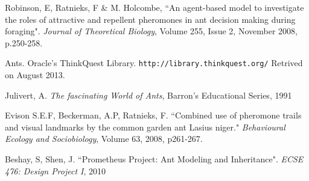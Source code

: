 \documentclass[titlepage, 12pt]{article}
\begin{document}
\begin{thebibliography}{9}

  Robinson, E, Ratnieks, F \& M. Holcombe, 
  ``An agent-based model to investigate the roles of attractive and repellent pheromones in ant decision making during foraging". \emph{Journal of Theoretical Biology}, Volume 255, Issue 2, November 2008, p.250-258.
  
Ants. Oracle's ThinkQuest Library. {\tt http://library.thinkquest.org/} Retrived on August 2013. 

Julivert, A. \emph{The fascinating World of Ants}, Barron's Educational Series, 1991

Evison S.E.F, Beckerman, A.P, Ratnieks, F. ``Combined use of pheromone trails and visual landmarks by the common garden ant Lasius niger." \emph{Behavioural Ecology and Sociobiology}, Volume 63, 2008, p261-267.

Beshay, S, Shen, J. ``Prometheus Project: Ant Modeling and Inheritance". \emph{ECSE 476: Design Project I}, 2010

\end{thebibliography}
\end{document}
